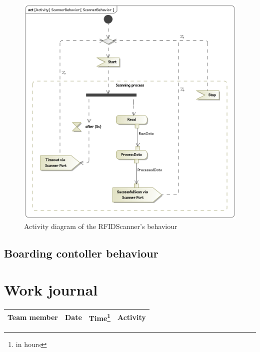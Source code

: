 \documentclass[a4paper]{article}
\begin{document}
\begin{figure}
	\includegraphics[width=\textwidth]{act-ScannerBehavior.jpg}
	\caption{Activity diagram of the \gls{RFIDScanner}'s behaviour}%
	\label{fig:act-ScannerBehavior}
\end{figure}


\subsection{Boarding contoller behaviour}




\section{Work journal}

\begin{tabularx}{\textwidth}{l l l X}
	\toprule
	Team member & Date & Time\footnote{in hours} & Activity \\ \midrule

	\bottomrule
\end{tabularx}

\clearpage
\glsaddall
\printglossaries
\end{document}

